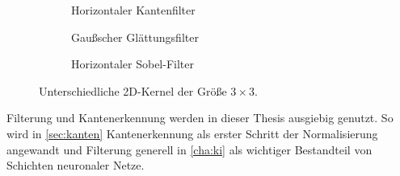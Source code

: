 \begin{figure}
    \centering
    \begin{subfigure}{0.3\textwidth}
        \centering
        \caption{Horizontaler Kantenfilter}
        \label{fig:kantenfilter}
    \end{subfigure}
    \hfill
    \begin{subfigure}{0.3\textwidth}
        \centering
        \caption{Gaußscher Glättungsfilter}
        \label{fig:glättungsfilter}
    \end{subfigure}
    \hfill
    \begin{subfigure}{0.3\textwidth}
        \centering
        \caption{Horizontaler Sobel-Filter}
        \label{fig:sobel}
    \end{subfigure}
    \caption{Unterschiedliche 2D-Kernel der Größe $3 \times 3$.}
    \label{fig:filter}
\end{figure}

Filterung und Kantenerkennung werden in dieser Thesis ausgiebig genutzt. So wird in \autoref{sec:kanten} Kantenerkennung als erster Schritt der Normalisierung angewandt und Filterung generell in \autoref{cha:ki} als wichtiger Bestandteil von Schichten neuronaler Netze.


